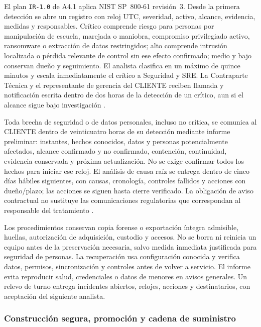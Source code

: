 El plan \texttt{IR-1.0} de A4.1 aplica NIST SP~800-61 revisión~3. Desde la primera detección se abre un registro con reloj UTC, severidad, activo, alcance, evidencia, medidas y responsables. Crítico comprende riesgo para personas por manipulación de escuela, marejada o maniobra, compromiso privilegiado activo, ransomware o extracción de datos restringidos; alto comprende intrusión localizada o pérdida relevante de control sin ese efecto confirmado; medio y bajo conservan dueño y seguimiento. El analista clasifica en un máximo de quince minutos y escala inmediatamente el crítico a Seguridad y SRE. La Contraparte Técnica y el representante de gerencia del CLIENTE reciben llamada y notificación escrita dentro de dos horas de la detección de un crítico, aun si el alcance sigue bajo investigación \parencites{sec-nist-incidentes}[RT-11.18, p.~24]{pucv-transversal}.

Toda brecha de seguridad o de datos personales, incluso no crítica, se comunica al CLIENTE dentro de veinticuatro horas de su detección mediante informe preliminar: instantes, hechos conocidos, datos y personas potencialmente afectados, alcance confirmado y no confirmado, contención, continuidad, evidencia conservada y próxima actualización. No se exige confirmar todos los hechos para iniciar ese reloj. El análisis de causa raíz se entrega dentro de cinco días hábiles siguientes, con causas, cronología, controles fallidos y acciones con dueño/plazo; las acciones se siguen hasta cierre verificado. La obligación de aviso contractual no sustituye las comunicaciones regulatorias que correspondan al responsable del tratamiento \parencite[RT-11.19, p.~24; RT-14.06, p.~27]{pucv-transversal}.

Los procedimientos conservan copia forense o exportación íntegra admisible, huellas, autorización de adquisición, custodio y accesos. No se borra ni reinicia un equipo antes de la preservación necesaria, salvo medida inmediata justificada para seguridad de personas. La recuperación usa configuración conocida y verifica datos, permisos, sincronización y controles antes de volver a servicio. El informe evita reproducir salud, credenciales o datos de menores en avisos generales. Un relevo de turno entrega incidentes abiertos, relojes, acciones y destinatarios, con aceptación del siguiente analista.

\subsubsection{Construcción segura, promoción y cadena de suministro}
\label{sec:4-devsecops-rt}


